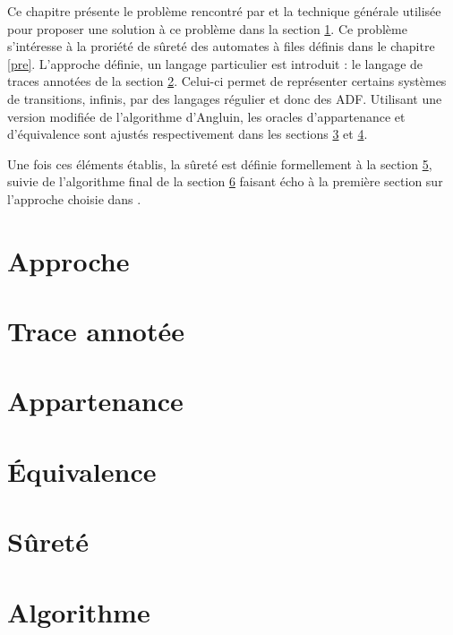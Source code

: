 Ce chapitre présente le problème rencontré par \cite{Vardhan04} et la technique générale utilisée pour proposer une solution à ce problème dans la section \ref{app}. Ce problème s'intéresse à la proriété de sûreté des automates à files définis dans le chapitre \ref{pre}. L'approche définie, un langage particulier est introduit : le langage de traces annotées de la section \ref{trace}. Celui-ci permet de représenter certains systèmes de transitions, infinis, par des langages régulier et donc des ADF. Utilisant une version modifiée de l'algorithme d'Angluin, les oracles d'appartenance et d'équivalence sont ajustés respectivement dans les sections \ref{mem} et \ref{eq}.

Une fois ces éléments établis, la sûreté est définie formellement à la section \ref{safety}, suivie de l'algorithme final de la section \ref{lever} faisant écho à la première section sur l'approche choisie dans \cite{Vardhan04}.


\section{Approche}\label{app}
\section{Trace annotée}\label{trace}
\section{Appartenance}\label{mem}
\section{Équivalence}\label{eq}
\section{Sûreté}\label{safety}
\section{Algorithme}\label{lever}
